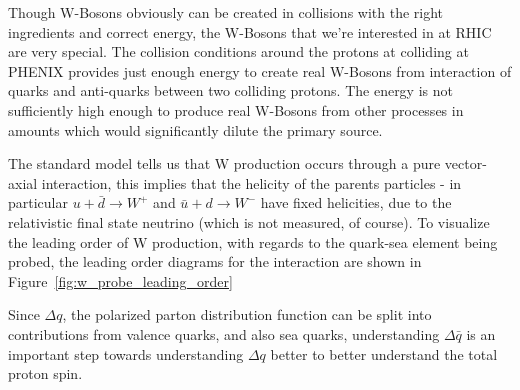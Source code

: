 Though W-Bosons obviously can be created in collisions with the right
ingredients and correct energy, the W-Bosons that we're interested in at RHIC
are very special. The collision conditions around the protons at colliding at
PHENIX provides just enough energy to create real W-Bosons from interaction of
quarks and anti-quarks between two colliding protons. The energy is not
sufficiently high enough to produce real W-Bosons from other processes in
amounts which would significantly dilute the primary source.

The standard model tells us that W production occurs through a pure vector-axial
interaction, this implies that the helicity of the parents particles - in
particular $u+\bar{d}\rightarrow W^+$ and $\bar{u}+d\rightarrow W^-$ have fixed
helicities, due to the relativistic final state neutrino (which is not measured,
of course). To visualize the leading order of W production, with regards to the
quark-sea element being probed, the leading order diagrams for the interaction
are shown in Figure~\ref{fig:w_probe_leading_order}~\cite{Aidala2005}

Since $\Delta q$, the polarized parton distribution function can be split into
contributions from valence quarks, and also sea quarks, understanding $\Delta
\bar{q}$ is an important step towards understanding $\Delta q$ better to better
understand the total proton spin.

